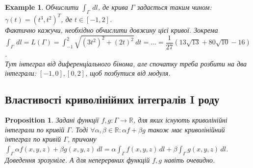 \documentclass[a4paper, 10pt]{article}
\theoremstyle{theoremdd}
\theoremstyle{theoremdd}
\theoremstyle{theoremdd}
\theoremstyle{theoremdd}
\theoremstyle{theoremdd}
\newtheorem{example}[theorem]{Example}
\theoremstyle{theoremdd}
\theoremstyle{theoremdd}
\theoremstyle{theoremdd}
\theoremstyle{theoremdd}
\newtheorem{proposition}[theorem]{Proposition}
\theoremstyle{theoremdd}
\theoremstyle{theoremdd}
\theoremstyle{theoremdd}
\theoremstyle{theoremdd}
\theoremstyle{theoremdd}
\theoremstyle{theoremdd}
\begin{document}
\begin{example}
Обчислити $\displaystyle\int_\Gamma \,dl$, де крива $\Gamma$ задається таким чином:\\
$\gamma(t) = (t^3,t^2)^T$, де $t \in \left[ -1,2 \right]$.\\
Фактично кажучи, необхідно обчислити довжину цієї кривої. Зокрема\\
$\displaystyle\int_\Gamma \,dl = L(\Gamma) = \int_{-1}^2 \sqrt{(3t^2)^2 + (2t)^2}\,dt = \dots = \dfrac{1}{27} ( 13\sqrt{13} + 80 \sqrt{10} - 16 )$.\\
Тут інтеграл від диференціального бінома, але спочатку треба розбити на два інтеграли: $[-1,0], [0,2]$, щоб позбутися від модуля.
\end{example}

\iffalse
\begin{example}
Обчислити $\displaystyle\int_\Gamma (x+y)\,dl$, де крива $\Gamma$ задається як периметр чотирикутника з вершинами $A(0,-1), B(-1,3), C(3,2), D(2,-2)$.\\
Наш інтеграл розіб'ємо на чотири частини:\\
$\displaystyle\int_\Gamma (x+y)\,dl = \int_{AB} (x+y)\,dl + \int_{BC} (x+y)\,dl + \int_{CD} (x+y)\,dl + \int_{DA} (x+y)\,dl$.\\
Розглянемо кожну криво окремо.\\
$AB$ можна описати прямою $y = -4x-1$. Або параметрично $\begin{cases} x = t \\ y = -4t -1 \end{cases}, t \in [-1,0]$. Тоді\\
$\displaystyle\int_{AB} (x+y)\,dl = \int_{-1}^0 (t-4t-1) \sqrt{1^2 + (-4)^2}\,dt$
\end{example}
\fi

\subsection{Властивості криволінійних інтегралів I роду}
\begin{proposition}
Задані функції $f,g: \Gamma \to \mathbb{R}$, для яких існують криволінійні інтеграли по кривій $\Gamma$. Тоді $\forall \alpha,\beta \in \mathbb{R}: \alpha f + \beta g$ також має криволінійний інтеграл по кривій $\Gamma$, причому\\
$\displaystyle\int_\Gamma \alpha f(x,y,z) + \beta g(x,y,z)\,dl = \alpha \int_\Gamma f(x,y,z)\,dl + \beta \int_\Gamma g(x,y,z)\,dl$.\\
\textit{Доведення зрозуміле. А для неперервних функцій $f,g$ навіть очевидно.}
\end{proposition}
\end{document}
